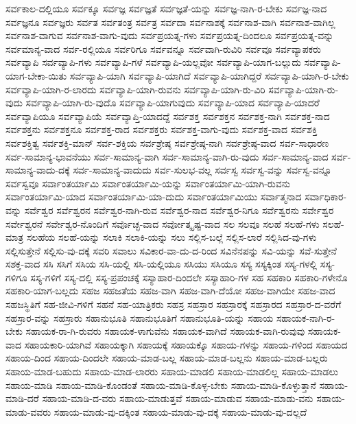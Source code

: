 {ಸರ್ವಕಾಲ-ದಲ್ಲಿಯೂ
ಸರ್ವಕ್ಕೂ
ಸರ್ವಜ್ಞ
ಸರ್ವಜ್ಞತೆ
ಸರ್ವಜ್ಞತೆ-ಯನ್ನು
ಸರ್ವಜ್ಞ-ನಾಗಿ-ರ-ಬೇಕು
ಸರ್ವಜ್ಞ-ನಾದ
ಸರ್ವಜ್ಞನೂ
ಸರ್ವಜ್ಞರು
ಸರ್ವತ
ಸರ್ವತಂತ್ರ
ಸರ್ವತ್ರ
ಸರ್ವದಾ
ಸರ್ವನಾಶಕ್ಕೆ
ಸರ್ವನಾಶ-ವಾಗಿ
ಸರ್ವನಾಶ-ವಾಗಿಲ್ಲ
ಸರ್ವನಾಶ-ವಾಗುವ
ಸರ್ವನಾಶ-ವಾಗು-ವುದು
ಸರ್ವಪ್ರಯತ್ನ-ಗಳು
ಸರ್ವಪ್ರಯತ್ನ-ದಿಂದಲೂ
ಸರ್ವಪ್ರಯತ್ನ-ವನ್ನು
ಸರ್ವಮಾನ್ಯ-ವಾದ
ಸರ್ವ-ರಲ್ಲಿಯೂ
ಸರ್ವರಿಗೂ
ಸರ್ವವನ್ನೂ
ಸರ್ವವಾಗಿ-ರುವಿರಿ
ಸರ್ವವೂ
ಸರ್ವವ್ಯಾಪಕರು
ಸರ್ವವ್ಯಾಪಿ
ಸರ್ವವ್ಯಾಪಿ-ಗಳು
ಸರ್ವವ್ಯಾಪಿ-ಗಳೆ
ಸರ್ವವ್ಯಾಪಿ-ಯಲ್ಲವೋ
ಸರ್ವವ್ಯಾಪಿ-ಯಾಗ-ಬಲ್ಲುದು
ಸರ್ವವ್ಯಾಪಿ-ಯಾಗ-ಬೇಕಾ-ಯಿತು
ಸರ್ವವ್ಯಾಪಿ-ಯಾಗಿ
ಸರ್ವವ್ಯಾಪಿ-ಯಾಗಿದೆ
ಸರ್ವವ್ಯಾಪಿ-ಯಾಗಿದ್ದರೆ
ಸರ್ವವ್ಯಾಪಿ-ಯಾಗಿ-ರ-ಬೇಕು
ಸರ್ವವ್ಯಾಪಿ-ಯಾಗಿ-ರ-ಲಾರದು
ಸರ್ವವ್ಯಾಪಿ-ಯಾಗಿ-ರುವನು
ಸರ್ವವ್ಯಾಪಿ-ಯಾಗಿ-ರು-ವಿರಿ
ಸರ್ವವ್ಯಾಪಿ-ಯಾಗಿ-ರು-ವುದು
ಸರ್ವವ್ಯಾಪಿ-ಯಾಗಿ-ರು-ವುದೊ
ಸರ್ವವ್ಯಾಪಿ-ಯಾಗುವುದು
ಸರ್ವವ್ಯಾಪಿ-ಯಾದ
ಸರ್ವವ್ಯಾಪಿ-ಯಾದರೆ
ಸರ್ವವ್ಯಾಪಿಯೂ
ಸರ್ವವ್ಯಾಪಿಯೆ
ಸರ್ವವ್ಯಾಪ್ತಿ-ಯಾದದ್ದೆ
ಸರ್ವಶಕ್ತ
ಸರ್ವಶಕ್ತನ
ಸರ್ವಶಕ್ತ-ನಾಗಿ
ಸರ್ವಶಕ್ತ-ನಾದ
ಸರ್ವಶಕ್ತನು
ಸರ್ವಶಕ್ತನೂ
ಸರ್ವಶಕ್ತ-ರಾದ
ಸರ್ವಶಕ್ತರು
ಸರ್ವಶಕ್ತ-ವಾಗು-ವುದು
ಸರ್ವಶಕ್ತ-ವಾದ
ಸರ್ವಶಕ್ತಿ
ಸರ್ವಶಕ್ತಿತ್ವ
ಸರ್ವಶಕ್ತಿ-ಮಾನ್
ಸರ್ವ-ಶಕ್ತಿಯ
ಸರ್ವಶ್ರೇಷ್ಠ
ಸರ್ವಶ್ರೇಷ್ಠ-ನಾಗಿ
ಸರ್ವಶ್ರೇಷ್ಠ-ವಾದ
ಸರ್ವ-ಸಾಧಾರಣ
ಸರ್ವ-ಸಾಮಾನ್ಯ-ಭಾವನೆಯು
ಸರ್ವ-ಸಾಮಾನ್ಯ-ವಾಗಿ
ಸರ್ವ-ಸಾಮಾನ್ಯ-ವಾಗಿ-ರು-ವುದು
ಸರ್ವ-ಸಾಮಾನ್ಯ-ವಾದ
ಸರ್ವ-ಸಾಮಾನ್ಯ-ವಾದು-ದಕ್ಕೆ
ಸರ್ವ-ಸಾಮಾನ್ಯ-ವಾದುದು
ಸರ್ವ-ಸುಲಭ-ವಲ್ಲ
ಸರ್ವಸ್ವ
ಸರ್ವಸ್ವ-ವನ್ನು
ಸರ್ವಸ್ವ-ವನ್ನೂ
ಸರ್ವಸ್ವವೂ
ಸರ್ವಾಂತರ್ಯಾಮಿ
ಸರ್ವಾಂತರ್ಯಾಮಿ-ಯನ್ನು
ಸರ್ವಾಂತರ್ಯಾಮಿ-ಯಾಗಿ-ರುವನು
ಸರ್ವಾಂತರ್ಯಾಮಿ-ಯಾದ
ಸರ್ವಾಂತರ್ಯಾಮಿ-ಯಾ-ದುದು
ಸರ್ವಾಂತರ್ಯಾಮಿಯು
ಸರ್ವಾತ್ಮನಾದ
ಸರ್ವಾಧಿಕಾರ-ವನ್ನು
ಸರ್ವೆಶ್ವರ
ಸರ್ವೆಶ್ವರನ
ಸರ್ವೆಶ್ವರ-ನಾಗಿ-ರುವ
ಸರ್ವೆಶ್ವರ-ನಾದ
ಸರ್ವೆಶ್ವರ-ನಿಗೂ
ಸರ್ವೆಶ್ವರನು
ಸರ್ವೇಶ್ವರ
ಸರ್ವೇಶ್ವರನೆ
ಸರ್ವೇಶ್ವರ-ನೊಂದಿಗೆ
ಸರ್ವೊಚ್ಛ-ವಾದ
ಸರ್ವೋತ್ಕೃಷ್ಟ-ವಾದ
ಸಲ
ಸಲವೂ
ಸಲಹೆ
ಸಲಹೆ-ಗಳು
ಸಲಹೆ-ಮಾತ್ರ
ಸಲಹೆಯ
ಸಲಹೆ-ಯನ್ನು
ಸಲಾಕಿ
ಸಲಾಕಿ-ಯನ್ನು
ಸಲು
ಸಲ್ಲಿಸ-ಬಲ್ಲೆ
ಸಲ್ಲಿಸ-ಲಾರೆ
ಸಲ್ಲಿಸಿದ-ವು-ಗಳು
ಸಲ್ಲಿಸುತ್ತೇನೆ
ಸಲ್ಲಿಸು-ವು-ದಕ್ಕೆ
ಸವರಿ
ಸವಾಲು
ಸವಿಕಾರ-ವಾ-ದು-ದ-ರಿಂದ
ಸವಿನೆನಪನ್ನು
ಸವಿ-ಯನ್ನು
ಸವೆ-ಸುತ್ತೇನೆ
ಸಶಕ್ತ-ವಾದ
ಸಸಿ
ಸಸಿಗೆ
ಸಸಿಯ
ಸಸಿ-ಯಲ್ಲಿ
ಸಸಿ-ಯಲ್ಲಿಯೂ
ಸಸಿಯು
ಸಸಿಯೂ
ಸಸ್ಯ
ಸಸ್ಯಕ್ಕಿಂತ
ಸಸ್ಯ-ಗಳಲ್ಲಿ
ಸಸ್ಯ-ಗಳಿಗೂ
ಸಸ್ಯ-ಗಳಿಗೆ
ಸಸ್ಯ-ದಲ್ಲಿ
ಸಸ್ಯ-ಪ್ರಪಂಚಕ್ಕೆ
ಸಸ್ಯಾಹಾರ-ದಿಂದಲೇ
ಸಸ್ಯಾಹಾರಿ-ಗಳ
ಸಹ
ಸಹಕಾರಿ
ಸಹಕಾರಿ-ಗಳೇನೊ
ಸಹಕಾರಿ-ಯಾಗ-ಬಲ್ಲದು
ಸಹಜ
ಸಹಜತೆಯ
ಸಹಜ-ವಾಗಿ
ಸಹಜ-ವಾಗಿ-ದೆಯೋ
ಸಹಜ-ವಾಗಿಯೇ
ಸಹಜ-ವಾದ
ಸಹಜಸ್ಥಿತಿಗೆ
ಸಹ-ಜೀವಿ-ಗಳಿಗೆ
ಸಹನೆ
ಸಹ-ಯಾತ್ರಿಕರು
ಸಹಸ್ರ
ಸಹಸ್ರಾರ
ಸಹಸ್ರಾರಕ್ಕೆ
ಸಹಸ್ರಾರದ
ಸಹಸ್ರಾರ-ದ-ವರೆಗೆ
ಸಹಸ್ರಾರ-ವನ್ನು
ಸಹಸ್ರಾರು
ಸಹಾನುಭೂತಿ
ಸಹಾನುಭೂತಿಗೆ
ಸಹಾನುಭೂತಿ-ಯನ್ನು
ಸಹಾಯ
ಸಹಾಯಕ-ನಾಗಿ-ರ-ಬೇಕು
ಸಹಾಯಕ-ರಾ-ಗಿ-ರುವರು
ಸಹಾಯಕ-ಳಾಗುವೆನು
ಸಹಾಯಕ-ವಾಗಿದೆ
ಸಹಾಯಕ-ವಾಗಿ-ರುವುವು
ಸಹಾಯಕ-ವಾದ
ಸಹಾಯಕಾರಿ-ಯಾಗಿವೆ
ಸಹಾಯಕ್ಕಾಗಿ
ಸಹಾಯಕ್ಕೆ
ಸಹಾಯಕ್ಕೊ
ಸಹಾಯ-ಗಳನ್ನು
ಸಹಾಯ-ಗಳಿಂದ
ಸಹಾಯದ
ಸಹಾಯ-ದಿಂದ
ಸಹಾಯ-ದಿಂದಲೇ
ಸಹಾಯ-ಮಾಡ-ಬಲ್ಲ
ಸಹಾಯ-ಮಾಡ-ಬಲ್ಲನು
ಸಹಾಯ-ಮಾಡ-ಬಲ್ಲರು
ಸಹಾಯ-ಮಾಡ-ಬಹುದು
ಸಹಾಯ-ಮಾಡ-ಲಾರರು
ಸಹಾಯ-ಮಾಡಲಿ
ಸಹಾಯ-ಮಾಡಲಿಲ್ಲ
ಸಹಾಯ-ಮಾಡಲು
ಸಹಾಯ-ಮಾಡಿ
ಸಹಾಯ-ಮಾಡಿ-ಕೊಂಡಂತೆ
ಸಹಾಯ-ಮಾಡಿ-ಕೊಳ್ಳ-ಬೇಕು
ಸಹಾಯ-ಮಾಡಿ-ಕೊಳ್ಳುತ್ತಾನೆ
ಸಹಾಯ-ಮಾಡಿ-ದರೆ
ಸಹಾಯ-ಮಾಡಿ-ದ-ವರು
ಸಹಾಯ-ಮಾಡುತ್ತವೆ
ಸಹಾಯ-ಮಾಡುವ
ಸಹಾಯ-ಮಾಡು-ವನು
ಸಹಾಯ-ಮಾಡು-ವವರು
ಸಹಾಯ-ಮಾಡು-ವು-ದಕ್ಕಿಂತ
ಸಹಾಯ-ಮಾಡು-ವು-ದಕ್ಕೆ
ಸಹಾಯ-ಮಾಡು-ವು-ದಲ್ಲದೆ
}
